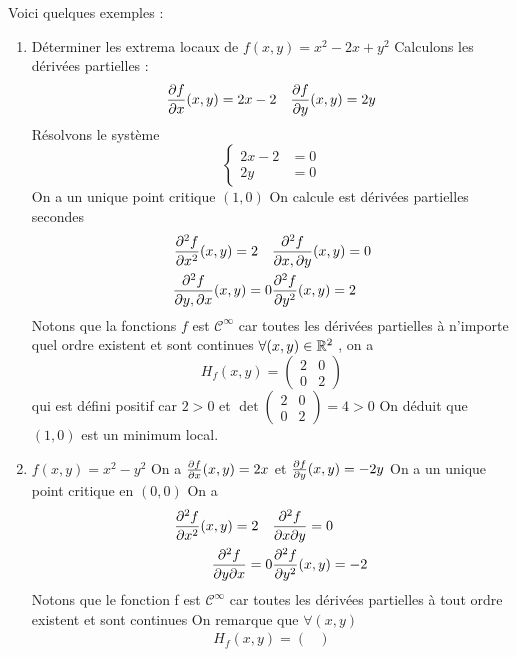 Voici quelques exemples :
    \begin{enumerate}
        \item Déterminer les extrema locaux  de $f(x,y) = x^2 - 2x + y^2$
        Calculons les dérivées partielles  : \begin{align*}
            \frac{\partial f}{\partial x}(x,y) = 2x - 2\quad \frac{\partial f}{\partial y}(x,y) = 2y
        \end{align*}
        Résolvons le système
        $$\begin{cases}
            2x - 2 &= 0\\
            2y &= 0
        \end{cases}$$
        On a un unique point critique $(1,0)$
        On calcule est dérivées partielles secondes 
        \begin{align*}
            \frac{\partial ^2f}{\partial x^2}(x,y) = 2\quad & \frac{\partial ^2f}{\partial x,\partial y}(x,y) = 0\\
             \frac{\partial ^2f}{\partial y,\partial x}(x,y) = 0 & \frac{\partial ^2f}{\partial y^2}(x,y) = 2
        \end{align*}
        Notons que la fonctions $f$ est $\mathcal C^\infty$ car toutes les dérivées partielles à n'importe quel ordre existent et sont continues 
        $\forall (x,y) \in \mathbb{R}^2$ , on a $$H_f(x,y) = \begin{pmatrix}
            2 & 0\\0& 2
        \end{pmatrix}$$ qui est défini positif car $2 > 0$ et $\det\begin{pmatrix}
            2 & 0\\0& 2
        \end{pmatrix} = 4>0$
        On déduit que $(1,0)$ est un minimum local.
        \item $f(x,y) = x^2-y^2$
        On a $\frac{\partial f}{\partial x}(x,y) = 2x$ et $\frac{\partial f}{\partial y}(x,y) = -2y$
        On a un unique point critique en $(0,0)$
        On a \begin{align*}
            \frac{\partial ^2f}{\partial x^2}(x, y) = 2\quad & \frac{\partial ^2f}{\partial x\partial y } = 0\\
            \frac{\partial ^2f}{\partial y\partial x } = 0 & \frac{\partial ^2f}{\partial y^2}(x, y) = -2
        \end{align*}
        Notons que le fonction f est $\mathcal C^\infty$ car toutes les dérivées partielles à tout ordre existent et sont continues 
        On remarque que $\forall (x,y)$
        \begin{align*}
        H_f(x,y) = \begin{pmatrix}

\end{pmatrix}
\end{align*}
\end{enumerate}
